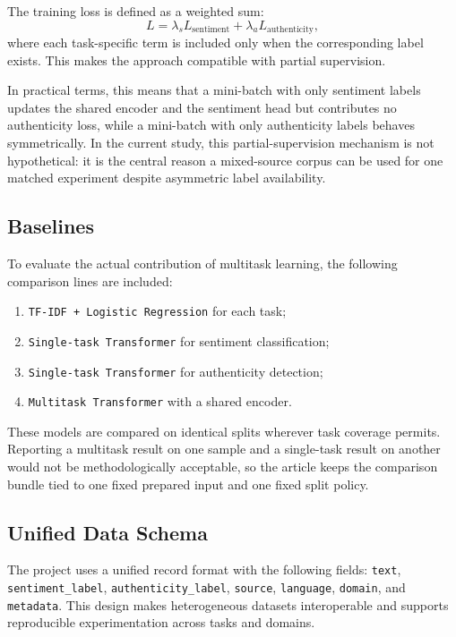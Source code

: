 \documentclass[12pt,a4paper]{article}
\begin{document}
The training loss is defined as a weighted sum:
\begin{equation}
L = \lambda_s L_{\text{sentiment}} + \lambda_a L_{\text{authenticity}},
\end{equation}
where each task-specific term is included only when the corresponding label exists. This makes the approach compatible with partial supervision.

In practical terms, this means that a mini-batch with only sentiment labels updates the shared encoder and the sentiment head but contributes no authenticity loss, while a mini-batch with only authenticity labels behaves symmetrically. In the current study, this partial-supervision mechanism is not hypothetical: it is the central reason a mixed-source corpus can be used for one matched experiment despite asymmetric label availability.

\subsection{Baselines}

To evaluate the actual contribution of multitask learning, the following comparison lines are included:

\begin{enumerate}[label=\arabic*.]
  \item \texttt{TF-IDF + Logistic Regression} for each task;
  \item \texttt{Single-task Transformer} for sentiment classification;
  \item \texttt{Single-task Transformer} for authenticity detection;
  \item \texttt{Multitask Transformer} with a shared encoder.
\end{enumerate}

These models are compared on identical splits wherever task coverage permits. Reporting a multitask result on one sample and a single-task result on another would not be methodologically acceptable, so the article keeps the comparison bundle tied to one fixed prepared input and one fixed split policy.

\subsection{Unified Data Schema}

The project uses a unified record format with the following fields:
\texttt{text}, \texttt{sentiment\_label}, \texttt{authenticity\_label}, \texttt{source}, \texttt{language}, \texttt{domain}, and \texttt{metadata}. This design makes heterogeneous datasets interoperable and supports reproducible experimentation across tasks and domains.
\end{document}
